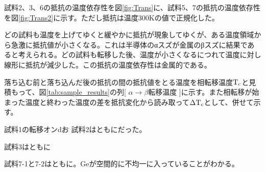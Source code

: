 試料2、3、6の抵抗の温度依存性を図\ref{fig:Trans}に、試料5、7の抵抗の温度依存性を図\ref{fig:Trans2}に示す。ただし抵抗は温度300Kの値で正規化した。

どの試料も温度を上げてゆくと緩やかに抵抗が現象してゆくが、ある温度領域から急激に抵抗値が小さくなる。これは半導体のαスズが金属のβスズに結果であると考えられる。どの試料も転移した後、温度が小さくなるにつれて温度に対し線形に抵抗が減少した。この抵抗の温度依存性は金属的である。

落ち込む前と落ち込んだ後の抵抗の間の抵抗値をとる温度を相転移温度$\rm T_c$と見積もって、図\ref{tab:sample_results}の列[ $\alpha\to\beta$転移温度 ]に示す。また相転移が始まった温度と終わった温度の差を抵抗変化から読み取って$\rm \Delta T_c$として、併せて示す。

試料1の転移オンdお
試料2はともにだった。

試料3はともに

試料7-1と7-2はともに。Geが空間的に不均一に入っていることがわかる。

